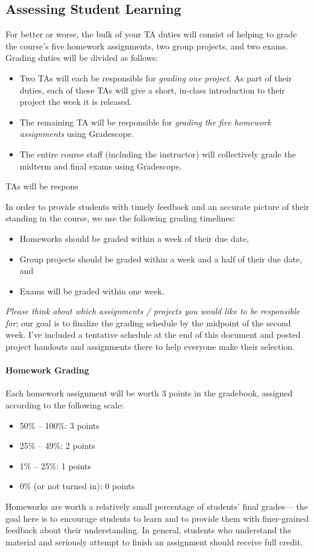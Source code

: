 \documentclass[letterpaper,11pt]{article}
\begin{document}
\subsection*{Assessing Student Learning}
For better or worse, the bulk of your TA duties will consist of
helping to grade the course's five homework assignments, two group
projects, and two exams. Grading duties will be divided as
follows:
\begin{itemize}
\item Two TAs will each be responsible for \emph{grading one project}.
  As part of their duties, each of these TAs will give a short,
  in-class introduction to their project the week it is released.
\item The remaining TA will be responsible for \emph{grading the five
    homework assignments} using Gradescope.
\item The entire course staff (including the instructor) will
  collectively grade the midterm and final exams using Gradescope.
\end{itemize}

TAs will be respons

In order to provide students with timely feedback and an accurate
picture of their standing in the course, we use the following grading
timelines:
\begin{itemize}
\item Homeworks should be graded within a week of their due date,
\item Group projects should be graded within a week and a half of
  their due date, and
\item Exams will be graded within one week.
\end{itemize}
\emph{Please think about which assignments / projects you would like
  to be responsible for}; our goal is to finalize the grading schedule
by the midpoint of the second week. I've included a tentative schedule
at the end of this document and posted project handouts and
assignments there to help everyone make their selection.

\paragraph{Homework Grading}
Each homework assignment will be worth 3 points in the gradebook,
assigned according to the following scale:
\begin{itemize}
\item 50\% -- 100\%: 3 points
\item 25\% -- 49\%: 2 points
\item 1\% -- 25\%: 1 points
\item 0\% (or not turned in): 0 points
\end{itemize}
Homeworks are worth a relatively small percentage of students' final
grades--- the goal here is to encourage students to learn and to
provide them with finer-grained feedback about their understanding.
In general, students who understand the material and seriously attempt
to finish an assignment should receive full credit.
\end{document}
